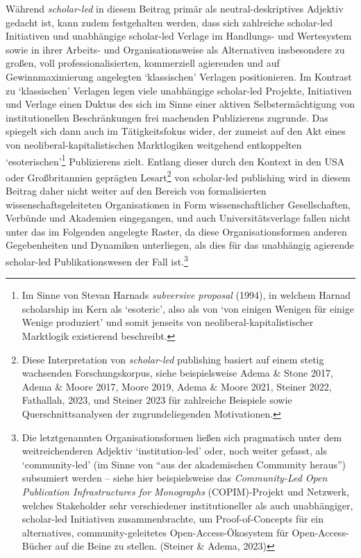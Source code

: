 \documentclass[a4paper,
fontsize=11pt,
oneside,
numbers=noperiodatend,
parskip=half-,
bibliography=totoc,
final
]{scrartcl}
\begin{document}
Während \emph{scholar-led} in diesem Beitrag primär als
neutral-deskriptives Adjektiv gedacht ist, kann zudem festgehalten
werden, dass sich zahlreiche scholar-led Initiativen und unabhängige
scholar-led Verlage im Handlungs- und Wertesystem sowie in ihrer
Arbeits- und Organisationsweise als Alternativen insbesondere zu großen,
voll professionalisierten, kommerziell agierenden und auf
Gewinnmaximierung angelegten \enquote*{klassischen} Verlagen
positionieren. Im Kontrast zu \enquote*{klassischen} Verlagen legen
viele unabhängige scholar-led Projekte, Initiativen und Verlage einen
Duktus des sich im Sinne einer aktiven Selbstermächtigung von
institutionellen Beschränkungen frei machenden Publizierens zugrunde.
Das spiegelt sich dann auch im Tätigkeitsfokus wider, der zumeist auf
den Akt eines von neoliberal-kapitalistischen Marktlogiken weitgehend
entkoppelten \enquote*{esoterischen}\footnote{Im Sinne von Stevan
  Harnads \emph{subversive proposal} (1994), in welchem Harnad
  scholarship im Kern als \enquote*{esoteric}, also als von
  \enquote*{von einigen Wenigen für einige Wenige produziert} und somit
  jenseits von neoliberal-kapitalistischer Marktlogik existierend
  beschreibt.} Publizierens zielt. Entlang dieser durch den Kontext in
den USA oder Großbritannien geprägten Lesart\footnote{Diese
  Interpretation von \emph{scholar-led} publishing basiert auf einem
  stetig wachsenden Forschungskorpus, siehe beispielsweise Adema \&
  Stone 2017, Adema \& Moore 2017, Moore 2019, Adema \& Moore 2021,
  Steiner 2022, Fathallah, 2023, und Steiner 2023 für zahlreiche
  Beispiele sowie Querschnittsanalysen der zugrundeliegenden
  Motivationen.} von scholar-led publishing wird in diesem Beitrag daher
nicht weiter auf den Bereich von formalisierten wissenschaftsgeleiteten
Organisationen in Form wissenschaftlicher Gesellschaften, Verbünde und
Akademien eingegangen, und auch Universitätsverlage fallen nicht unter
das im Folgenden angelegte Raster, da diese Organisationsformen anderen
Gegebenheiten und Dynamiken unterliegen, als dies für das unabhängig
agierende scholar-led Publikationswesen der Fall ist.\footnote{Die
  letztgenannten Organisationsformen ließen sich pragmatisch unter dem
  weitreichenderen Adjektiv \enquote*{institution-led} oder, noch weiter
  gefasst, als \enquote*{community-led} (im Sinne von \enquote{aus der
  akademischen Community heraus}) subsumiert werden -- siehe hier
  beispielsweise das \emph{Community-Led Open Publication
  Infrastructures for Monographs} (COPIM)-Projekt und Netzwerk, welches
  Stakeholder sehr verschiedener institutioneller als auch unabhängiger,
  scholar-led Initiativen zusammenbrachte, um Proof-of-Concepts für ein
  alternatives, community-geleitetes Open-Access-Ökosystem für
  Open-Access-Bücher auf die Beine zu stellen. (Steiner \& Adema, 2023)}
\end{document}

